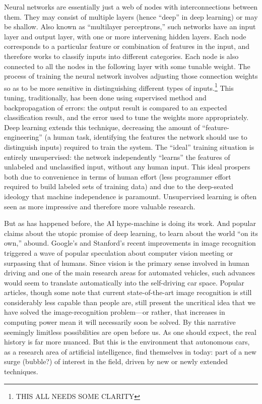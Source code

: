 Neural networks are essentially just a web of nodes with
interconnections between them. They may consist of multiple layers
(hence ``deep'' in deep learning) or may be shallow. Also known as
``multilayer perceptrons,'' such networks have an input layer and
output layer, with one or more intervening hidden layers. Each node
corresponds to a particular feature or combination of features in the
input, and therefore works to classify inputs into different
categories. Each node is also connected to all the nodes in the
following layer with some tunable weight. The process of training the
neural network involves adjusting those connection weights so as to
be more sensitive in distinguishing different types of
inputs.\footnote{THIS ALL NEEDS SOME CLARITY} This tuning,
traditionally, has been done using supervised method and
backpropagation of errors: the output result is compared to an
expected classification result, and the error used to tune the weights
more appropriately. Deep learning extends this technique, decreasing
the amount of ``feature-engineering'' (a human task, identifying the
features the network should use to distinguish inputs) required to
train the system. The ``ideal'' training situation is entirely
unsupervised: the network independently ``learns'' the features of
unlabeled and unclassified input, without any human input. This ideal
prospers both due to convenience in terms of human effort (less
programmer effort required to build labeled sets of training data) and
due to the deep-seated ideology that machine independence is
paramount. Unsupervised learning is often seen as more impressive and
therefore more valuable research.\cite{???}







But as has happened before, the AI hype-machine is doing its
work. And popular claims about the utopic promise of deep learning, to
learn about the world ``on its own,''
abound. Google's and Stanford's recent
improvements in image recognition\cite{markoffImage} triggered a wave
of popular speculation about computer vision meeting or surpassing
that of humans. Since vision is the primary sense involved in human driving
and one of the main research areas for automated vehicles, such
advances would seem to translate automatically into the self-driving
car space. Popular articles, though some note that current
state-of-the-art image recognition is still considerably less capable
than people are, still present the uncritical idea that we have solved
the image-recognition problem---or rather, that increases in computing
power mean it will necessarily soon be solved. By this narrative seemingly limitless
possibilities are open before us. As one should expect, the real
history is far more nuanced. But this is the environment that autonomous cars, as a
research area of artificial intelligence, find themselves in today:
part of a new surge (bubble?) of interest in the field, driven by new
or newly extended techniques.


